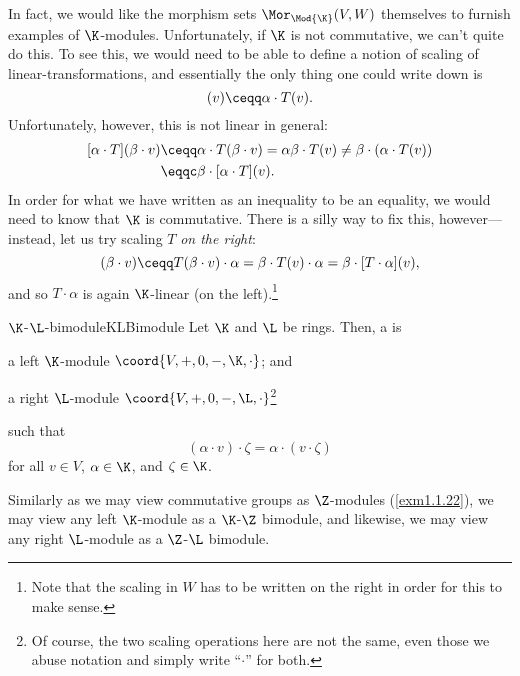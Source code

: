 In fact, we would like the morphism sets $\Mor _{\Mod{\K}}(V,W)$ themselves to furnish examples of $\K$-modules.  Unfortunately, if $\K$ is not commutative, we can't quite do this.  To see this, we would need to be able to define a notion of scaling of linear-transformations, and essentially the only thing one could write down is
\begin{equation}
[\alpha \cdot T](v)\ceqq \alpha \cdot T(v).
\end{equation}
Unfortunately, however, this is not linear in general:
\begin{equation}
\begin{split}
[\alpha \cdot T](\beta \cdot v) & \ceqq \alpha \cdot T(\beta \cdot v)=\alpha \beta \cdot T(v)\neq \beta \cdot (\alpha \cdot T(v)) \\
& \eqqc \beta \cdot [\alpha \cdot T](v).
\end{split}
\end{equation}
In order for what we have written as an inequality to be an equality, we would need to know that $\K$ is commutative.  There is a silly way to fix this, however---instead, let us try scaling $T$ \emph{on the right}:
\begin{equation}
[T\cdot \alpha ](\beta \cdot v)\ceqq T(\beta \cdot v)\cdot \alpha =\beta \cdot T(v)\cdot \alpha =\beta \cdot [T\cdot \alpha ](v),
\end{equation}
and so $T\cdot \alpha$ is again $\K$-linear (on the left).\footnote{Note that the scaling in $W$ has to be written on the right in order for this to make sense.}
\begin{dfn}{$\K$-$\L$-bimodule}{KLBimodule}
	Let $\K$ and $\L$ be rings.  Then, a  is
	\begin{data}
		\item a left $\K$-module $\coord{V,+,0,-,\K ,\cdot}$; and
		\item a right $\L$-module $\coord{V,+,0,-,\L ,\cdot}$\footnote{Of course, the two scaling operations here are not the same, even those we abuse notation and simply write ``$\cdot$'' for both.}
	\end{data}
	such that
	\begin{equation}
	(\alpha \cdot v)\cdot \zeta =\alpha \cdot (v\cdot \zeta )
	\end{equation}
	for all $v\in V$, $\alpha \in \K$, and $\zeta \in \K$.
	\begin{rmk}
		Similarly as we may view commutative groups as $\Z$-modules (\cref{exm1.1.22}), we may view any left $\K$-module as a $\K$-$\Z$ bimodule, and likewise, we may view any right $\L$-module as a $\Z$-$\L$ bimodule.
	\end{rmk}
\end{dfn}
